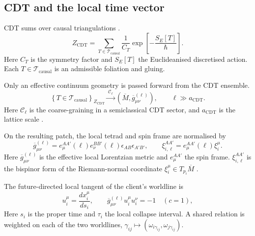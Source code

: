 \subsection{CDT and the local time vector}

CDT sums over causal triangulations \citep{ambjorn2004}.
\begin{equation}
  Z_{\mathrm{CDT}}=
  \sum_{T\in\mathcal T_{\mathrm{causal}}}\frac{1}{C_T}
  \exp\!\left[-\frac{S_E[T]}{\hbar}\right].
  \label{eq:cdt}
\end{equation}
\noindent Here $C_T$ is the symmetry factor and $S_E[T]$ the Euclideanised
discretised action. Each $T\in\mathcal T_{\mathrm{causal}}$ is an admissible
foliation and gluing.

Only an effective continuum geometry is passed forward from the CDT ensemble.
\begin{equation}
  \left\{T\in\mathcal T_{\mathrm{causal}}\right\}_{Z_{\mathrm{CDT}}}
  \xrightarrow{\ \mathcal C_\ell\ }
  (\overline M,\overline g_{\mu\nu}^{(\ell)}),
  \qquad \ell\gg a_{\mathrm{CDT}}.
  \label{eq:cdt_coarse_geometry}
\end{equation}
\noindent Here $\mathcal C_\ell$ is the coarse-graining in a semiclassical CDT
sector, and $a_{\mathrm{CDT}}$ is the lattice scale
\citep{ambjorn2004,benedetti2007}.

On the resulting patch, the local tetrad and spin frame are normalised by
\begin{equation}
  \overline g_{\mu\nu}^{(\ell)}=
  e_{\mu}^{AA'}(\ell)e_{\nu}^{BB'}(\ell)\epsilon_{AB}\epsilon_{A'B'},
  \qquad
  \xi_{i,\ell}^{AA'}=e_{\mu}^{AA'}(\ell)\xi_i^\mu.
  \label{eq:cdt_spinframe}
\end{equation}
\noindent Here $\overline g_{\mu\nu}^{(\ell)}$ is the effective local Lorentzian
metric and $e_\mu^{AA'}$ the spin frame. $\xi_{i,\ell}^{AA'}$ is the bispinor form
of the Riemann-normal coordinate $\xi_i^\mu\in T_{p_i}\overline M$
\citep{speziale2012}.

The future-directed local tangent of the client's worldline is
\begin{equation}
  u_i^\mu=\frac{dx_i^\mu}{ds_i},
  \qquad
  \overline g_{\mu\nu}^{(\ell)}u_i^\mu u_i^\nu=-1
  \quad(c=1),
  \label{eq:local_time_vector}
\end{equation}
\noindent Here $s_i$ is the proper time and $\tau_i$ the local collapse interval. A
shared relation is weighted on each of the two worldlines,
$\gamma_{ij}\mapsto(\omega_{i\gamma_{ij}},\omega_{j\gamma_{ij}})$.

